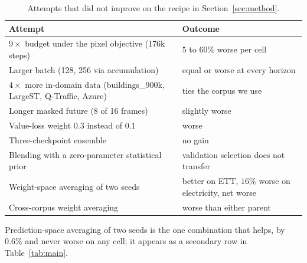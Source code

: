\begin{table}[h]
\caption{Attempts that did not improve on the recipe in Section~\ref{sec:method}.}
\label{tab:failed}
\begin{center}
\footnotesize
\begin{tabular}{p{}p{}}
\toprule
Attempt & Outcome \\
\midrule
$9\times$ budget under the pixel objective (176k steps) & $5$ to $60\%$ worse per cell \\
Larger batch (128, 256 via accumulation) & equal or worse at every horizon \\
$4\times$ more in-domain data (buildings\_900k, LargeST, Q-Traffic, Azure) & ties the corpus we use \\
Longer masked future (8 of 16 frames) & slightly worse \\
Value-loss weight $0.3$ instead of $0.1$ & worse \\
Three-checkpoint ensemble & no gain \\
Blending with a zero-parameter statistical prior & validation selection does not transfer \\
Weight-space averaging of two seeds & better on ETT, $16\%$ worse on electricity, net worse \\
Cross-corpus weight averaging & worse than either parent \\
\bottomrule
\end{tabular}
\end{center}
\end{table}

Prediction-space averaging of two seeds is the one combination that helps, by $0.6\%$ and never
worse on any cell; it appears as a secondary row in Table~\ref{tab:main}.
